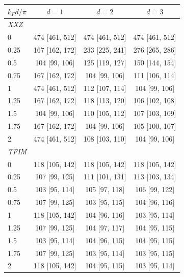 \begin{tabular}{lccc}
\toprule
$k_Fd/\pi$ & $d=1$ & $d=2$ & $d=3$ \\
\midrule
\multicolumn{4}{l}{\emph{XXZ}} \\
0 & 474 [461, 512] & 474 [461, 512] & 474 [461, 512] \\
0.25 & 167 [162, 172] & 233 [225, 241] & 276 [265, 286] \\
0.5 & 104 [99, 106] & 125 [119, 127] & 150 [144, 154] \\
0.75 & 167 [162, 172] & 104 [99, 106] & 111 [106, 114] \\
1 & 474 [461, 512] & 112 [107, 114] & 104 [99, 106] \\
1.25 & 167 [162, 172] & 118 [113, 120] & 106 [102, 108] \\
1.5 & 104 [99, 106] & 110 [105, 112] & 107 [103, 109] \\
1.75 & 167 [162, 172] & 104 [99, 106] & 105 [100, 107] \\
2 & 474 [461, 512] & 108 [103, 110] & 104 [99, 106] \\
\midrule
\multicolumn{4}{l}{\emph{TFIM}} \\
0 & 118 [105, 142] & 118 [105, 142] & 118 [105, 142] \\
0.25 & 107 [99, 125] & 111 [101, 131] & 113 [103, 134] \\
0.5 & 103 [95, 114] & 105 [97, 118] & 106 [99, 122] \\
0.75 & 107 [99, 125] & 103 [95, 115] & 104 [96, 116] \\
1 & 118 [105, 142] & 104 [96, 116] & 103 [95, 114] \\
1.25 & 107 [99, 125] & 104 [97, 117] & 104 [95, 115] \\
1.5 & 103 [95, 114] & 104 [96, 115] & 104 [95, 115] \\
1.75 & 107 [99, 125] & 103 [95, 114] & 103 [95, 115] \\
2 & 118 [105, 142] & 104 [95, 115] & 103 [95, 114] \\
\bottomrule
\end{tabular}
